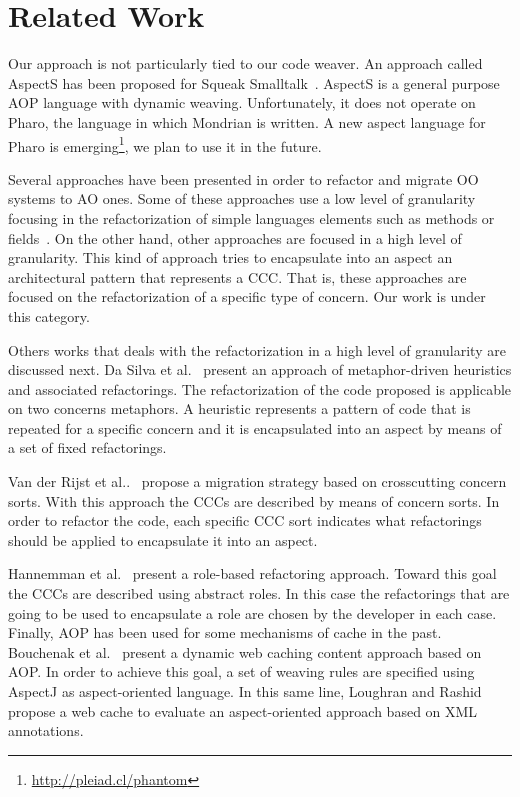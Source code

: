 \documentclass[preprint,10pt]{sigplanconf}
\newcommand{\seclabel}[1]{\label{sec:#1}}
\begin{document}
\section{Related Work}\seclabel{relatedWork}
Our approach is not particularly tied to our code weaver. An approach called AspectS has been proposed for Squeak Smalltalk~\cite{Hirschfeld2002}. AspectS is a general purpose AOP language with dynamic weaving. Unfortunately, it does not operate on Pharo, the language in which Mondrian is written. A new aspect language for Pharo is emerging\footnote{\url{http://pleiad.cl/phantom}}, we plan to use it in the future.

Several approaches have been presented in order to refactor and migrate OO systems to AO ones. Some of these approaches use a low level of granularity focusing in the refactorization of simple languages elements such as methods or fields~\cite{Ceccato2008,Tonella2005,Binkley2005,Deursen2005,Hannemann2003}. 
On the other hand, other approaches are focused in a high level of granularity. This kind of approach tries to encapsulate into an aspect an architectural pattern that represents a CCC. That is, these approaches are focused on the refactorization of a specific type of concern. Our work is under this category. 

Others works that deals with the refactorization in a high level of granularity are discussed next. Da Silva et al.~\cite{Silva2009} present an approach of metaphor-driven heuristics and associated refactorings. The refactorization of the code proposed is applicable on two concerns metaphors. A heuristic represents a pattern of code that is repeated for a specific concern and it is encapsulated into an aspect by means of a set of fixed refactorings.

Van der Rijst et al..~\cite{Rijst2008,Marin2009} propose a migration strategy based on crosscutting concern sorts. With this approach the CCCs are described by means of concern sorts. In order to refactor the code, each specific CCC sort indicates what refactorings should be applied to encapsulate it into an aspect. 

Hannemman et al.~\cite{Hannemann2005} present a role-based refactoring approach. Toward this goal the CCCs are described using abstract roles. In this case the refactorings that are going to be used to encapsulate a role are chosen by the developer in each case.
Finally, AOP has been used for some mechanisms of cache in the past. Bouchenak et al.~\cite{Bouchenak2006} present a dynamic web caching content approach based on AOP. In order to achieve this goal, a set of weaving rules are specified using AspectJ as aspect-oriented language. In this same line, Loughran and Rashid~\cite{Loughran2004} propose a web cache to evaluate an aspect-oriented approach based on XML annotations. 
\end{document}
